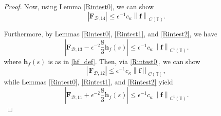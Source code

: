 \documentclass[11pt]{article}
\numberwithin{equation}{section}
\newcommand{\T}{\mathbb{T}}
\newcommand{\abs}[1]{\left\lvert #1 \right\rvert}
\newcommand{\norm}[1]{\left\lVert #1 \right\rVert}
\newcommand{\mc}[1]{\mathcal{#1}}
\theoremstyle{definition}
\begin{document}
\begin{proof}
Now, using Lemma \ref{Rintest0}, we can show
\begin{equation}\label{FD14_est}
\abs{\bm{F}_{\mc{D},14}} \le \epsilon^{-1} c_\kappa\norm{\bm{f}}_{C(\T)}. 
\end{equation}

Furthermore, by Lemmas \ref{Rintest0}, \ref{Rintest1}, and \ref{Rintest2}, we have
\begin{equation}\label{FD13_est}
\abs{\bm{F}_{\mc{D},13} - \epsilon^{-2}\frac{8}{3} \bm{h}_f(s)} \le \epsilon^{-1}c_\kappa\norm{\bm{f}}_{C^1(\T)}.
\end{equation}
where $\bm{h}_f(s)$ is as in \eqref{hf_def}. Then, via \ref{Rintest0}, we can show
\begin{equation}\label{FD12_est}
\abs{\bm{F}_{\mc{D},12}} \le \epsilon^{-1}c_\kappa\norm{\bm{f}}_{C(\T)},
\end{equation}
while Lemmas \ref{Rintest0}, \ref{Rintest1}, and \ref{Rintest2} yield
\begin{equation}\label{FD11_est}
\abs{\bm{F}_{\mc{D},11}+\epsilon^{-2} \frac{8}{3}\bm{h}_f(s)} \le \epsilon^{-1}c_\kappa\norm{\bm{f}}_{C^1(\T)}.
\end{equation}



\end{proof}
\end{document}
